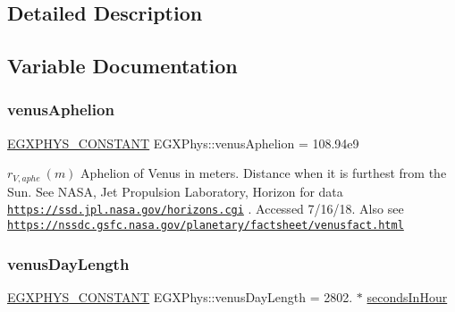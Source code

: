 \subsection{Detailed Description}


\subsection{Variable Documentation}
\mbox{\label{group___e_g_x_phys-_constants-_astrophysics-_solar_system-_venus-_orbit_ga46a4d6d0283aa74cabd679f51defc2b4}} 
\subsubsection{\texorpdfstring{venus\+Aphelion}{venusAphelion}}
{\footnotesize\ttfamily \mbox{\hyperlink{group___e_g_x_phys-_constants-_macros_ga76980d288494ce1714c9ac68a95ba702}{E\+G\+X\+P\+H\+Y\+S\+\_\+\+C\+O\+N\+S\+T\+A\+NT}} E\+G\+X\+Phys\+::venus\+Aphelion = 108.\+94e9}

$ r_{V,aphe} \ (m)$ Aphelion of Venus in meters. Distance when it is furthest from the Sun. See N\+A\+SA, Jet Propulsion Laboratory, Horizon for data \href{https://ssd.jpl.nasa.gov/horizons.cgi}{\tt https\+://ssd.\+jpl.\+nasa.\+gov/horizons.\+cgi} . Accessed 7/16/18. Also see \href{https://nssdc.gsfc.nasa.gov/planetary/factsheet/venusfact.html}{\tt https\+://nssdc.\+gsfc.\+nasa.\+gov/planetary/factsheet/venusfact.\+html} \mbox{\label{group___e_g_x_phys-_constants-_astrophysics-_solar_system-_venus-_orbit_ga735cf10c3a3d188f1979b5bc721ec953}} 
\subsubsection{\texorpdfstring{venus\+Day\+Length}{venusDayLength}}
{\footnotesize\ttfamily \mbox{\hyperlink{group___e_g_x_phys-_constants-_macros_ga76980d288494ce1714c9ac68a95ba702}{E\+G\+X\+P\+H\+Y\+S\+\_\+\+C\+O\+N\+S\+T\+A\+NT}} E\+G\+X\+Phys\+::venus\+Day\+Length = 2802. $\ast$ \mbox{\hyperlink{namespace_e_g_x_phys_a7c3165cd93e36f1fb8e9fef80f117bef}{seconds\+In\+Hour}}}

